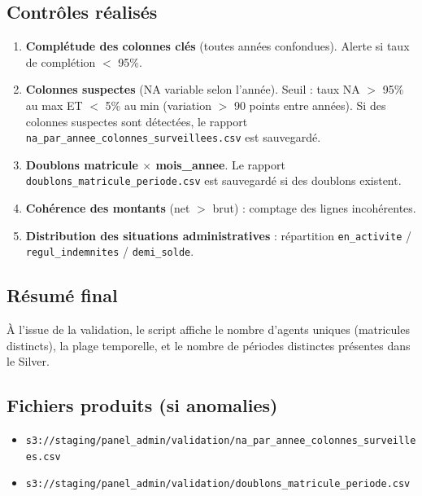 \documentclass[12pt,a4paper,french]{report}
\newcommand{\bucket}[1]{\texttt{s3://#1}}
\begin{document}
\subsection{Contrôles réalisés}

\begin{enumerate}
  \item \textbf{Complétude des colonnes clés} (toutes années confondues).
        Alerte si taux de complétion $<$ 95\%.

  \item \textbf{Colonnes suspectes} (NA variable selon l'année).
        Seuil : taux NA $>$ 95\% au max ET $<$ 5\% au min (variation $>$ 90
        points entre années). Si des colonnes suspectes sont détectées,
        le rapport \texttt{na\_par\_annee\_colonnes\_surveillees.csv} est
        sauvegardé.

  \item \textbf{Doublons matricule $\times$ mois\_annee}. Le rapport
        \texttt{doublons\_matricule\_periode.csv} est sauvegardé si des
        doublons existent.

  \item \textbf{Cohérence des montants} (net $>$ brut) : comptage des lignes
        incohérentes.

  \item \textbf{Distribution des situations administratives} : répartition
        \texttt{en\_activite} / \texttt{regul\_indemnites} /
        \texttt{demi\_solde}.
\end{enumerate}

\subsection{Résumé final}

À l'issue de la validation, le script affiche le nombre d'agents uniques
(matricules distincts), la plage temporelle, et le nombre de périodes
distinctes présentes dans le Silver.

\subsection{Fichiers produits (si anomalies)}

\begin{itemize}[nosep]
  \item \bucket{staging/panel\_admin/validation/na\_par\_annee\_colonnes\_surveillees.csv}
  \item \bucket{staging/panel\_admin/validation/doublons\_matricule\_periode.csv}
\end{itemize}
\end{document}
